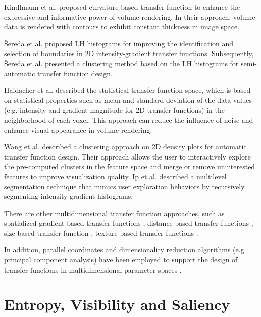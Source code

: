 \documentclass{egpubl}
\begin{document}
Kindlmann et al. \cite{kindlmann_curvature-based_2003} proposed curvature-based transfer function to enhance the expressive and informative power of volume rendering. In their approach, volume data is rendered with contours to exhibit constant thickness in image space.

{\v S}ereda et al. \cite{sereda_visualization_2006} proposed LH histograms for improving the identification and selection of boundaries in 2D intensity-gradient transfer functions. Subsequently, {\v S}ereda et al. \cite{sereda_automating_2006} presented a clustering method based on the LH histograms for semi-automatic transfer function design.

Haidacher et al. \cite{haidacher_volume_2010} described the statistical transfer function space, which is based on statistical properties such as mean and standard deviation of the data values (e.g. intensity and gradient magnitude for 2D transfer functions) in the neighborhood of each voxel. This approach can reduce the influence of noise and enhance visual appearance in volume rendering.

Wang et al. \cite{wang_automating_2012} described a clustering approach on 2D density plots for automatic transfer function design. Their approach allows the user to interactively explore the pre-computed clusters in the feature space and merge or remove uninterested features to improve visualization quality.
Ip et al. \cite{ip_hierarchical_2012} described a multilevel segmentation technique that mimics user exploration behaviors by recursively segmenting intensity-gradient histograms.

There are other multidimensional transfer function approaches, such as spatialized gradient-based transfer functions \cite{roettger_spatialized_2005}, distance-based transfer functions \cite{tappenbeck_distance-based_2006}, size-based transfer function \cite{correa_size-based_2008}, texture-based transfer functions \cite{caban_texture-based_2008} \cite{alper_selver_exploring_2015}.

In addition, parallel coordinates and dimensionality reduction algorithms (e.g. principal component analysis) have been employed to support the design of transfer functions in multidimensional parameter spaces \cite{zhao_multi-dimensional_2010} \cite{guo_multi-dimensional_2011} \cite{kim_dimensionality_2010}.

\section{Entropy, Visibility and Saliency}
\end{document}
